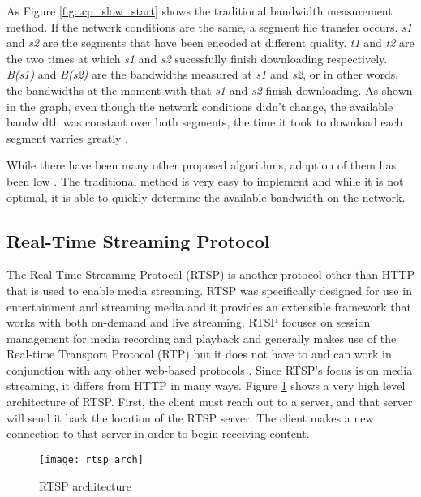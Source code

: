 \documentclass[12pt]{article}
\begin{document}
As Figure \ref{fig:tcp_slow_start} shows the traditional bandwidth measurement method.  If the network conditions are the same, a segment file transfer occurs. \textit{s1} and \textit{s2} are the segments that have been encoded at different quality.  \textit{t1} and \textit{t2} are the two times at which \textit{s1} and \textit{s2} sucessfully finish downloading respectively. \textit{B(s1)} and \textit{B(s2)} are the bandwidths measured at \textit{s1} and \textit{s2}, or in other words, the bandwidths at the moment with that \textit{s1} and \textit{s2} finish downloading.  As shown in the graph, even though the network conditions didn't change, the available bandwidth was constant over both segments, the time it took to download each segment varries greatly \cite{7057917}.

While there have been many other proposed algorithms, adoption of them has been low \cite{6698072}\cite{7057917}.  The traditional method is very easy to implement and while it is not optimal, it is able to quickly determine the available bandwidth on the network.

\subsection{Real-Time Streaming Protocol}
The Real-Time Streaming Protocol (RTSP) is another protocol other than HTTP that is used to enable media streaming.  RTSP was specifically designed for use in entertainment and streaming media and it provides an extensible framework that works with both on-demand and live streaming.  RTSP focuses on session management for media recording and playback and generally makes use of the Real-time Transport Protocol (RTP) but it does not have to and can work in conjunction with any other web-based protocols \cite{rtsp_ieee}.  Since RTSP's focus is on media streaming, it differs from HTTP in many ways.  Figure \ref{fig:rtsp_arch} shows a very high level architecture of RTSP.  First, the client must reach out to a server, and that server will send it back the location of the RTSP server.  The client makes a new connection to that server in order to begin receiving content.

\begin{figure}[htp]
  \begin{center}
    \texttt{[image: rtsp\_arch]}
    \caption{RTSP architecture}
    \label{fig:rtsp_arch}
  \end{center}
\end{figure}
\end{document}
